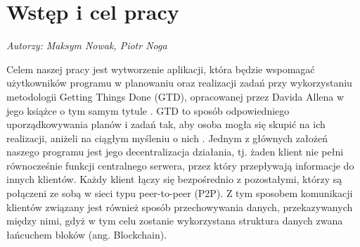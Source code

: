 \chapter{Wstęp i cel pracy}
\label{chap:wstep}
\textit{Autorzy: Maksym Nowak, Piotr Noga}
\par Celem naszej pracy jest wytworzenie aplikacji, która będzie wspomagać użytkowników programu w planowaniu oraz realizacji zadań przy wykorzystaniu metodologii Getting Things Done (GTD), opracowanej przez Davida Allena w jego książce o tym samym tytule \cite{GTD}. GTD to sposób odpowiedniego uporządkowywania planów i zadań tak, aby osoba mogła się skupić na ich realizacji, aniżeli na ciągłym myśleniu o nich \cite{DAllInt}. Jednym z głównych założeń naszego programu jest jego decentralizacja działania, tj. żaden klient nie pełni równocześnie funkcji centralnego serwera, przez który przepływają informacje do innych klientów. Każdy klient łączy się bezpośrednio z pozostałymi, którzy są połączeni ze sobą w sieci typu peer-to-peer (P2P). Z tym sposobem komunikacji klientów związany jest również sposób przechowywania danych, przekazywanych między nimi, gdyż w tym celu zostanie wykorzystana struktura danych zwana łańcuchem bloków (ang. Blockchain).

